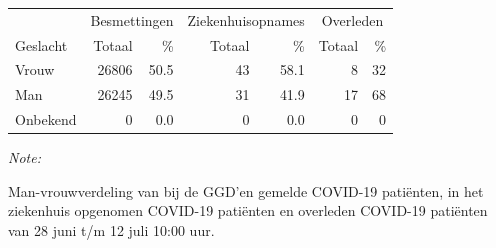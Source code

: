 \documentclass[
  english,
  man,floatsintext]{apa6}
\begin{document}
\begin{table}
\centering\begingroup\fontsize{11}{13}\selectfont

\begin{threeparttable}
\begin{tabular}{lrrrrrr}
\toprule
\multicolumn{1}{c}{ } & \multicolumn{2}{c}{Besmettingen} & \multicolumn{2}{c}{Ziekenhuisopnames} & \multicolumn{2}{c}{Overleden} \\
\cmidrule(l{3pt}r{3pt}){2-3} \cmidrule(l{3pt}r{3pt}){4-5} \cmidrule(l{3pt}r{3pt}){6-7}
Geslacht & Totaal & \% & Totaal & \% & Totaal & \%\\
\midrule
Vrouw & 26806 & 50.5 & 43 & 58.1 & 8 & 32\\
Man & 26245 & 49.5 & 31 & 41.9 & 17 & 68\\
Onbekend & 0 & 0.0 & 0 & 0.0 & 0 & 0\\
\bottomrule
\end{tabular}
\begin{tablenotes}
\item \textit{Note: } 
\item Man-vrouwverdeling van bij de GGD’en gemelde COVID-19 patiënten, in het ziekenhuis opgenomen COVID-19 patiënten en overleden COVID-19 patiënten van 28 juni t/m 12 juli 10:00 uur.
\end{tablenotes}
\end{threeparttable}
\endgroup{}
\end{table}
\newpage
\end{document}
